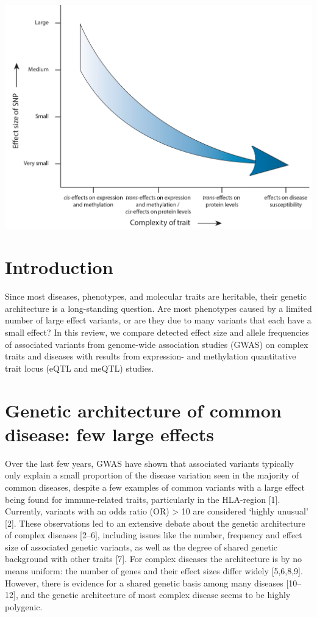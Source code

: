 \includegraphics[scale=0.1]{chapters/chapter2-genetic-architecture/img/AbstractFigureCorrectSizeWhite}

\section{Introduction}

Since most diseases, phenotypes, and molecular traits are heritable, their genetic architecture is a long-standing question. Are most phenotypes caused by a limited number of large effect variants, or are they due to many variants that each have a small effect? In this review, we compare detected effect size and allele frequencies of associated variants from genome-wide association studies (GWAS) on complex traits and diseases with results from expression- and methylation quantitative trait locus (eQTL and meQTL) studies.

\section{Genetic architecture of common disease: few large effects}
Over the last few years, GWAS have shown that associated variants typically only explain a small proportion of the disease variation seen in the majority of common diseases, despite a few examples of common variants with a large effect being found for immune-related traits, particularly in the HLA-region [1]. Currently, variants with an odds ratio (OR) > 10 are considered ‘highly unusual’ [2]. These observations led to an extensive debate about the genetic architecture of complex diseases [2–6], including issues like the number, frequency and effect size of associated genetic variants, as well as the degree of shared genetic background with other traits [7]. For complex diseases the architecture is by no means uniform: the number of genes and their effect sizes differ widely [5,6,8,9]. However, there is evidence for a shared genetic basis among many diseases [10–12], and the genetic architecture of most complex disease seems to be highly polygenic.

